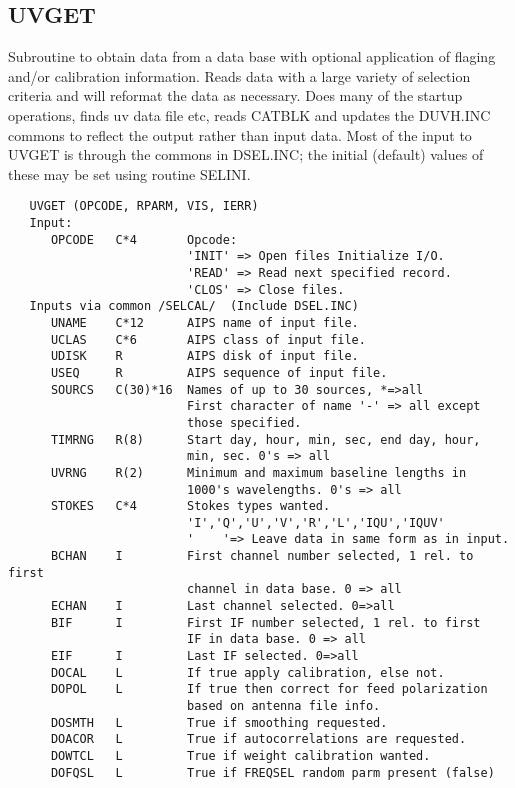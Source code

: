 \subsection{UVGET}
Subroutine to obtain data from a data base with optional application
of flaging and/or calibration information.  Reads data with a large
variety of selection criteria and will reformat the data as
necessary.  Does many of the startup operations, finds uv data file
etc, reads CATBLK and updates the DUVH.INC commons to reflect the
output rather than input data.
   Most of the input to UVGET is through the commons in DSEL.INC;
the initial (default) values of these may be set using routine
SELINI.
\begin{verbatim}
   UVGET (OPCODE, RPARM, VIS, IERR)
   Input:
      OPCODE   C*4       Opcode:
                         'INIT' => Open files Initialize I/O.
                         'READ' => Read next specified record.
                         'CLOS' => Close files.
   Inputs via common /SELCAL/  (Include DSEL.INC)
      UNAME    C*12      AIPS name of input file.
      UCLAS    C*6       AIPS class of input file.
      UDISK    R         AIPS disk of input file.
      USEQ     R         AIPS sequence of input file.
      SOURCS   C(30)*16  Names of up to 30 sources, *=>all
                         First character of name '-' => all except
                         those specified.
      TIMRNG   R(8)      Start day, hour, min, sec, end day, hour,
                         min, sec. 0's => all
      UVRNG    R(2)      Minimum and maximum baseline lengths in
                         1000's wavelengths. 0's => all
      STOKES   C*4       Stokes types wanted.
                         'I','Q','U','V','R','L','IQU','IQUV'
                         '    '=> Leave data in same form as in input.
      BCHAN    I         First channel number selected, 1 rel. to first
                         channel in data base. 0 => all
      ECHAN    I         Last channel selected. 0=>all
      BIF      I         First IF number selected, 1 rel. to first
                         IF in data base. 0 => all
      EIF      I         Last IF selected. 0=>all
      DOCAL    L         If true apply calibration, else not.
      DOPOL    L         If true then correct for feed polarization
                         based on antenna file info.
      DOSMTH   L         True if smoothing requested.
      DOACOR   L         True if autocorrelations are requested.
      DOWTCL   L         True if weight calibration wanted.
      DOFQSL   L         True if FREQSEL random parm present (false)

\end{verbatim}
